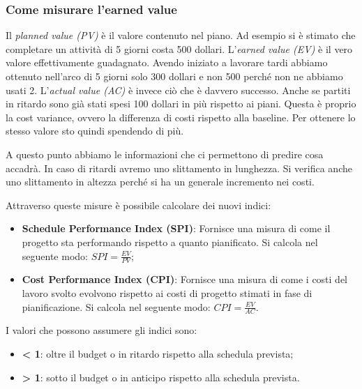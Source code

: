 \subsubsection{Come misurare l'earned value}
Il \textit{planned value (PV)} è il valore contenuto nel piano. Ad esempio si è stimato che completare un attività di 5 giorni costa 500 dollari.\newline
L'\textit{earned value (EV)} è il vero valore effettivamente guadagnato. Avendo iniziato a lavorare tardi abbiamo ottenuto nell'arco di 5 giorni solo 300 dollari e non 500 perché non ne abbiamo usati 2.\newline
L'\textit{actual value (AC)} è invece ciò che è davvero successo. Anche se partiti in ritardo sono già stati spesi 100 dollari in più rispetto ai piani. Questa è proprio la cost variance, ovvero la differenza di costi rispetto alla baseline. Per ottenere lo stesso valore sto quindi spendendo di più.

\noindent A questo punto abbiamo le informazioni che ci permettono di predire cosa accadrà. In caso di ritardi avremo uno slittamento in lunghezza. Si verifica anche uno slittamento in altezza perché si ha un generale incremento nei costi.

\noindent Attraverso queste misure è possibile calcolare dei nuovi indici:
\begin{itemize}
	\item \textbf{Schedule Performance Index (SPI)}: Fornisce una misura di come il progetto sta performando rispetto a quanto
	pianificato. Si calcola nel seguente modo: $SPI = \frac{EV}{PV}$;
	\item \textbf{Cost Performance Index (CPI)}: Fornisce una misura di come i costi del lavoro svolto evolvono rispetto ai
	costi di progetto stimati in fase di pianificazione. Si calcola nel seguente modo: $CPI = \frac{EV}{AC}$.
\end{itemize}
I valori che possono assumere gli indici sono:
\begin{itemize}
	\item \textbf{< 1}: oltre il budget o in ritardo rispetto alla schedula prevista;
	\item \textbf{> 1}: sotto il budget o in anticipo rispetto alla schedula prevista.
\end{itemize}

